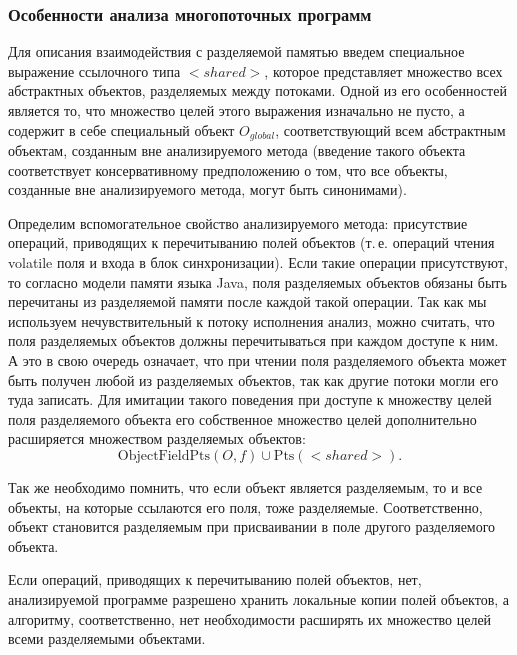 \documentclass[14pt,titlepage]{extarticle}
\newcommand{\Pts}[1]{\textrm{Pts}(#1)}
\newcommand{\OFPts}[2]{\textrm{ObjectFieldPts}(#1, #2)}
\newcommand{\eng}[1]{{\English#1}}
\newcommand{\java}{\eng{Java}\xspace}
\begin{document}
      \subsubsection{Особенности анализа многопоточных программ}

        Для описания взаимодействия с разделяемой памятью введем специальное
        выражение ссылочного типа ${<}shared{>}$, которое представляет
        множество всех абстрактных объектов, разделяемых между потоками. Одной
        из его особенностей является то, что множество целей этого выражения
        изначально не пусто, а содержит в себе специальный объект
        $O_{global}$, соответствующий всем абстрактным объектам, созданным
        вне анализируемого метода (введение такого объекта соответствует
        консервативному предположению о том, что все объекты, созданные вне
        анализируемого метода, могут быть синонимами).

        Определим вспомогательное свойство анализируемого метода: присутствие
        операций, приводящих к перечитыванию полей объектов (т.\,е. операций
        чтения \eng{volatile} поля и входа в блок синхронизации). Если такие
        операции присутствуют, то согласно модели памяти языка \java, поля
        разделяемых объектов обязаны быть перечитаны из разделяемой памяти
        после каждой такой операции. Так как мы используем нечувствительный к
        потоку исполнения анализ, можно считать, что поля разделяемых объектов
        должны перечитываться при каждом доступе к ним. А это в свою очередь
        означает, что при чтении поля разделяемого объекта может быть получен
        любой из разделяемых объектов, так как другие потоки могли его туда
        записать.
        Для имитации такого поведения при доступе к множеству целей поля
        разделяемого объекта его собственное множество целей дополнительно
        расширяется множеством разделяемых объектов:
        \[\OFPts{O}{f} \cup \Pts{{<}shared{>}}.\]

        Так же необходимо помнить, что если объект является разделяемым, то и
        все объекты, на которые ссылаются его поля, тоже разделяемые.
        Соответственно, объект становится разделяемым при присваивании в поле
        другого разделяемого объекта.

        Если операций, приводящих к перечитыванию полей объектов, нет,
        анализируемой программе разрешено хранить локальные копии полей
        объектов, а алгоритму, соответственно, нет необходимости расширять их
        множество целей всеми разделяемыми объектами.
\end{document}
